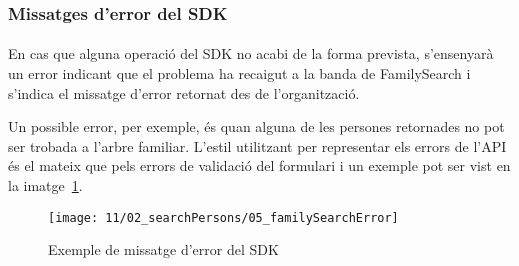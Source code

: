 \subsubsection{Missatges d'error del SDK}

\paragraph{}
En cas que alguna operació del SDK no acabi de la forma prevista, s'ensenyarà un error indicant que el problema ha recaigut a la banda de FamilySearch i s’indica el missatge d’error retornat des de l’organització.

Un possible error, per exemple, és quan alguna de les persones retornades no pot ser trobada a l'arbre familiar. L'estil utilitzant per representar els errors de l'API és el mateix que pels errors de validació del formulari i un exemple pot ser vist en la imatge~\ref{fig:fsError}.

\begin{figure}[h]
    \texttt{[image: 11/02\_searchPersons/05\_familySearchError]}
    \centering
    \caption{Exemple de missatge d'error del SDK}\label{fig:fsError}
\end{figure}
